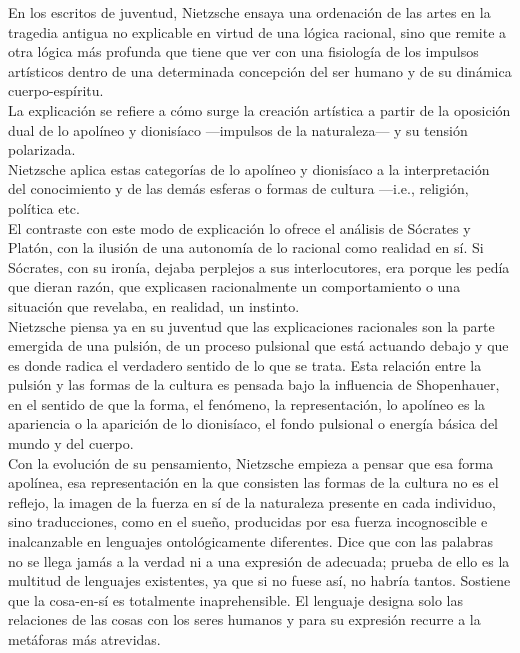 \documentclass[a4paper, 10pt, twocolumn, spanish]{article}
\begin{document}
En los escritos de juventud, Nietzsche ensaya una ordenación de las
artes en la tragedia antigua no explicable en virtud de una lógica
racional, sino que remite a otra lógica más profunda que tiene que ver
con una fisiología de los impulsos artísticos dentro de una
determinada concepción del ser humano y de su dinámica
cuerpo-espíritu.\\[0pt]
La explicación se refiere a cómo surge la creación artística a partir
de la oposición dual de lo apolíneo y dionisíaco —impulsos de la
naturaleza— y su tensión polarizada.\\[0pt]
Nietzsche aplica estas categorías de lo apolíneo y dionisíaco a la
interpretación del conocimiento y de las demás esferas o formas de
cultura —i.e., religión, política etc.\\[0pt]
El contraste con este modo de explicación lo ofrece el análisis de
Sócrates y Platón, con la ilusión de una autonomía de lo racional como
realidad en sí. Si Sócrates, con su ironía, dejaba perplejos a sus
interlocutores, era porque les pedía que dieran razón, que explicasen
racionalmente un comportamiento o una situación que revelaba, en
realidad, un instinto.\\[0pt]

Nietzsche piensa ya en su juventud que las explicaciones racionales
son la parte emergida de una pulsión, de un proceso pulsional que está
actuando debajo y que es donde radica el verdadero sentido de lo que
se trata. Esta relación entre la pulsión y las formas de la cultura es
pensada bajo la influencia de Shopenhauer, en el sentido de que la
forma, el fenómeno, la representación, lo apolíneo es la apariencia o
la aparición de lo dionisíaco, el fondo pulsional o energía básica del
mundo y del cuerpo.\\[0pt]
Con la evolución de su pensamiento, Nietzsche empieza a pensar que esa
forma apolínea, esa representación en la que consisten las formas de
la cultura no es el reflejo, la imagen de la fuerza en sí de la
naturaleza presente en cada individuo, sino traducciones, como en el
sueño, producidas por esa fuerza incognoscible e inalcanzable en
lenguajes ontológicamente diferentes. Dice que con las palabras no se
llega jamás a la verdad ni a una expresión de adecuada; prueba de ello
es la multitud de lenguajes existentes, ya que si no fuese así, no
habría tantos. Sostiene que la cosa-en-sí es totalmente
inaprehensible. El lenguaje designa solo las relaciones de las cosas
con los seres humanos y para su expresión recurre a la metáforas más
atrevidas.\\[0pt]
\end{document}
